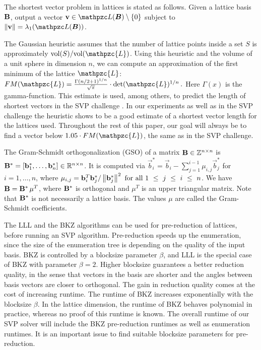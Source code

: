 \begin{CJK}{Bg5}{bsmi}

The shortest vector problem in lattices is stated as follows. Given a lattice basis $\mathbf{B}$, output a vector $\vec{v} \in \latticeb{B} \setminus \{0\}$ subject to $\norm{\vec{v}} = \lambda_{1}(\latticeb{B})$.

The Gaussian heuristic assumes that the number of lattice points inside a set $S$ is approximately $\text{vol}(S) / \text{vol}(\mathpzc{L})$. Using this heuristic and the volume of a unit sphere in dimension $n$, we can compute an approximation of the first minimum of the lattice $\mathpzc{L}$:
%
$\FM(\mathpzc{L}) =  \frac{\Gamma(n/2+1)^{1/n}}{\sqrt{\pi}} \cdot \det(\mathpzc{L})^{1/n}\,.$
Here $\Gamma(x)$ is the gamma-function.
This estimate is used, among others, to predict the length of shortest vectors in the SVP challenge \cite{svpchallenge}. In our experiments as well as in the SVP challenge the heuristic shows to be a good estimate of a shortest vector length for the lattices used. Throughout the rest of this paper, our goal will always be to find a vector below $1.05 \cdot \FM(\mathpzc{L})$, the same as in the SVP challenge.

The Gram-Schmidt orthogonalization (GSO) of a matrix $\mathbf{B} \in \mathbb{Z}^{n \times n}$ is
$\mathbf{B}^{*} = [\mathbf{b}_{1}^{*}, \ldots, \mathbf{b}_{n}^{*}] \in \mathbb{R}^{n \times n}$. It is computed via $\vec{b}_{i}^* = \vec{b}_{i}- \sum_{j=1}^{i-1}\mu_{i,j}\vec{b}^*_{j}$ for $i = 1,\ldots , n$, where
$\mu_{i,j} = \mathbf{b}_{i}^T \mathbf{b}_{j}^* / \left\|\mathbf{b}_{j}^*\right\|^2 \text{ for all } 1~\le~j~\le~i~\le~n$.
We have $\mathbf{B} = \mathbf{B}^* \, \mu^{T}$, where $\mathbf{B}^*$ is orthogonal and $\mu^{T}$ is an upper triangular matrix. Note that $\mathbf{B}^{*}$ is not necessarily a lattice basis. The values $\mu$ are called the Gram-Schmidt coefficients.



The LLL \cite{LLL:1982} and the BKZ \cite{SchnorrE1994} algorithms can be used for pre-reduction of lattices, before running an SVP algorithm. Pre-reduction speeds up the enumeration, since the size of the enumeration tree is depending on the quality of the input basis. BKZ is controlled by a blocksize parameter $\beta$, and LLL is the special case of BKZ with parameter $\beta = 2$. Higher blocksize guarantees a better reduction quality, in the sense that vectors in the basis are shorter and the angles between basis vectors are closer to orthogonal. The gain in reduction quality comes at the cost of increasing runtime. The runtime of BKZ increases exponentially with the blocksize $\beta$. In the lattice dimension, the runtime of BKZ behaves polynomial in practice, whereas no proof of this runtime is known. The overall runtime of our SVP solver will include the BKZ pre-reduction runtimes as well as enumeration runtimes. It is an important issue to find suitable blocksize parameters for pre-reduction.




\end{CJK}
